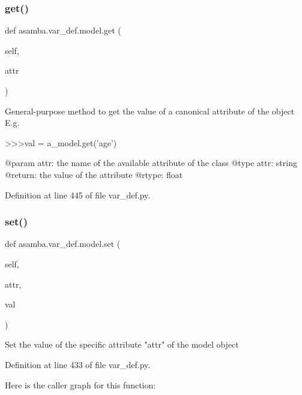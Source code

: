 \subsubsection{\texorpdfstring{get()}{get()}}
{\footnotesize\ttfamily def asamba.\+var\+\_\+def.\+model.\+get (\begin{DoxyParamCaption}\item[{}]{self,  }\item[{}]{attr }\end{DoxyParamCaption})}

\begin{DoxyVerb}General-purpose method to get the value of a canonical attribute of the object
E.g.

>>>val = a_model.get('age')

@param attr: the name of the available attribute of the class
@type attr: string
@return: the value of the attribute
@rtype: float
\end{DoxyVerb}
 

Definition at line 445 of file var\+\_\+def.\+py.

\mbox{\label{classasamba_1_1var__def_1_1model_adf918a64e584736b39e108f4c705d413}} 
\subsubsection{\texorpdfstring{set()}{set()}}
{\footnotesize\ttfamily def asamba.\+var\+\_\+def.\+model.\+set (\begin{DoxyParamCaption}\item[{}]{self,  }\item[{}]{attr,  }\item[{}]{val }\end{DoxyParamCaption})}

\begin{DoxyVerb}Set the value of the specific attribute "attr" of the model object
\end{DoxyVerb}
 

Definition at line 433 of file var\+\_\+def.\+py.

Here is the caller graph for this function\+:
\mbox{\label{classasamba_1_1var__def_1_1model_a49205357c320bfe944bc1177b3d3a4ee}} 
